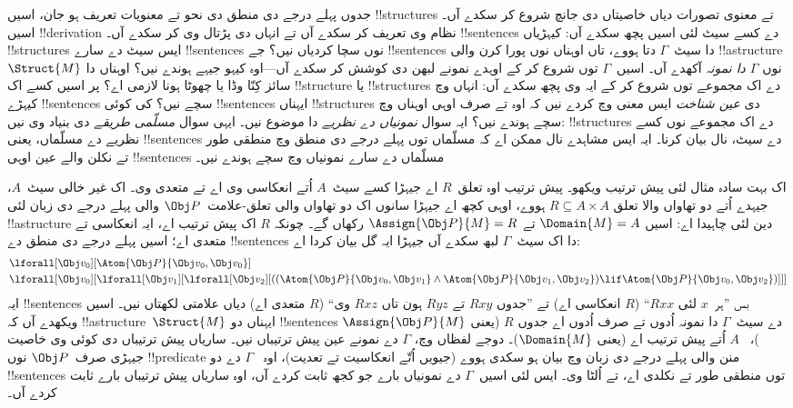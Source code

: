 \documentclass[../../../include/open-logic-section]{subfiles}
\begin{document}


جدوں پہلے درجے دی منطق دی نحو تے معنویات
تعریف ہو جان، اسیں !!{structure}s تے معنوی
تصورات دیاں خاصیتاں دی جانچ شروع کر سکدے
آں۔ اسیں !!{derivation} نظام وی تعریف
کر سکدے آں تے انہاں دی پڑتال وی کر
سکدے آں۔ !!{sentence}s دے کسے سیٹ
لئی اسیں پچھ سکدے آں: کیہڑیاں
!!{structure}s ایس سیٹ دے سارے
!!{sentence}s نوں سچا کردیاں نیں؟
جے !!{sentence}s دا سیٹ~$\Gamma$
دتا ہووے، تاں اوہناں نوں پورا کرن والی
!!a{structure}~$\Struct{M}$ نوں
\emph{$\Gamma$ دا نمونہ} آکھدے آں۔
اسیں~$\Gamma$ توں شروع کر کے
اوہدے نمونے لبھن دی کوشش کر سکدے
آں---اوہ کیہو جیہے ہوندے نیں؟
اوہناں دا سائز کِنّا وڈا یا چھوٹا
ہونا لازمی اے؟ پر اسیں کسے اک
!!{structure} یا !!{structure}s دے
اک مجموعے توں شروع کر کے ایہ وی
پچھ سکدے آں: انہاں وچ کیہڑے
!!{sentence}s سچے نیں؟ کی کوئی
!!{sentence}s ایہناں !!{structure}s
دی \emph{عین شناخت} ایس معنی وچ
کردے نیں کہ اوہ تے صرف اوہی
اوہناں وچ سچے ہوندے نیں؟
ایہ سوال \emph{نمونیاں دے نظریے}
دا موضوع نیں۔ ایہی سوال
\emph{مسلّمی طریقے} دی بنیاد
وی نیں: !!{structure}s دے اک
مجموعے نوں کسے نظریے دے
مسلّماں، یعنی !!{sentence}s
دے سیٹ، نال بیان کرنا۔
ایہ ایس مشاہدے نال ممکن اے
کہ مسلّماں توں پہلے درجے دی
منطق وچ منطقی طور تے نکلن
والے عین اوہی !!{sentence}s
مسلّماں دے سارے نمونیاں وچ
سچے ہوندے نیں۔

اک بہت سادہ مثال لئی پیش ترتیب
ویکھو۔ پیش ترتیب اوہ تعلق~$R$
اے جیہڑا کسے سیٹ~$A$ اُتے
انعکاسی وی اے تے متعدی وی۔
اک غیر خالی سیٹ~$A$، جیہدے اُتے دو
تھاواں والا تعلق
$R \subseteq A \times A$
ہووے، اوہی کچھ اے جیہڑا
سانوں اک دو تھاواں والی
تعلق-علامت~$\Obj P$ والی
پہلے درجے دی زبان لئی
!!a{structure} دین لئی چاہیدا
اے: اسیں $\Domain{M} = A$
تے $\Assign{\Obj P}{M} = R$
رکھاں گے۔ چونکہ $R$ اک
پیش ترتیب اے، ایہ انعکاسی
تے متعدی اے؛ اسیں پہلے
درجے دی منطق دے
!!{sentence}s دا اک
سیٹ~$\Gamma$ لبھ سکدے
آں جیہڑا ایہ گل بیان کردا اے:
\begin{align*}
  & \lforall[\Obj v_0][\Atom{\Obj P}{\Obj v_0,\Obj v_0}]\\
  & \lforall[\Obj v_0][\lforall[\Obj v_1][\lforall[\Obj v_2][((\Atom{\Obj P}{\Obj v_0,\Obj v_1} \land \Atom{\Obj P}{\Obj v_1,\Obj v_2}) \lif \Atom{\Obj P}{\Obj v_0,\Obj v_2})]]]
\end{align*}
ایہ !!{sentence}s بس ”ہر~$x$ لئی
$Rxx$“ ($R$ انعکاسی اے)
تے ”جدوں $Rxy$ تے $Ryz$
ہون تاں $Rxz$ وی“ ($R$
متعدی اے) دیاں علامتی
لکھتاں نیں۔ اسیں ویکھدے
آں کہ !!a{structure}~$\Struct{M}$
ایہناں دو !!{sentence}s دے
سیٹ~$\Gamma$ دا نمونہ
اُدوں تے صرف اُدوں اے
جدوں $R$ (یعنی
$\Assign{\Obj P}{M}$)،
~$A$ اُتے پیش ترتیب
اے (یعنی $\Domain{M}$)۔
دوجے لفظاں وچ، $\Gamma$
دے نمونے عین پیش ترتیباں
نیں۔ ساریاں پیش ترتیباں
دی کوئی وی خاصیت جیہڑی
صرف~$\Obj P$ نوں
!!{predicate} منن والی
پہلے درجے دی زبان وچ
بیان ہو سکدی ہووے
(جیویں اُتّے انعکاسیت
تے تعدیت)، اوہ
~$\Gamma$ دے دو
!!{sentence}s توں منطقی
طور تے نکلدی اے،
تے اُلٹا وی۔ ایس لئی
اسیں~$\Gamma$ دے
نمونیاں بارے جو کجھ
ثابت کردے آں، اوہ
ساریاں پیش ترتیباں
بارے ثابت کردے آں۔
\end{document}

